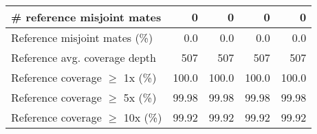 \documentclass[12pt,a4paper]{article}
\begin{document}
\begin{table}[ht]
\begin{center}
\begin{tabular}{|l*{4}{|r}|}
\# reference misjoint mates & 0 & 0 & 0 & 0 \\ \hline
Reference misjoint mates (\%) & 0.0 & 0.0 & 0.0 & 0.0 \\ \hline
Reference avg. coverage depth & 507 & 507 & 507 & 507 \\ \hline
Reference coverage $\geq$ 1x (\%) & 100.0 & 100.0 & 100.0 & 100.0 \\ \hline
Reference coverage $\geq$ 5x (\%) & 99.98 & 99.98 & 99.98 & 99.98 \\ \hline
Reference coverage $\geq$ 10x (\%) & 99.92 & 99.92 & 99.92 & 99.92 \\ \hline
\end{tabular}
\end{center}
\end{table}
\end{document}
